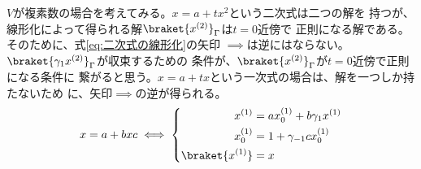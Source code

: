 {\begin{todo}[ここまで]
		$V$が複素数の場合を考えてみる。$x=a+tx^2$という二次式は二つの解を
		持つが、線形化によって得られる解$\braket{x^{(2)}}_\Gamma$は$t=0$近傍で
		正則になる解である。そのために、式\eqref{eq:二次式の線形化}の矢印
		$\implies$は逆にはならない。
		$\braket{\gamma_1x^{(2)}}_\Gamma$が収束するための
		条件が、$\braket{x^{(2)}}_\Gamma$が$t=0$近傍で正則になる条件に
		繋がると思う。$x=a+tx$という一次式の場合は、解を一つしか持たないため
		に、矢印$\implies$の逆が得られる。
		\begin{equation*}\begin{split}
			x = a + bxc \iff \left\{\begin{split}
				x^{(1)} &= ax_0^{(1)} + b\gamma_1x^{(1)} \\
				x_0^{(1)} &= 1 + \gamma_{-1}cx_0^{(1)}  \\
				\braket{x^{(1)}} &= x \\
			\end{split}\right.
		\end{split}\end{equation*}
	\end{todo} %

}
